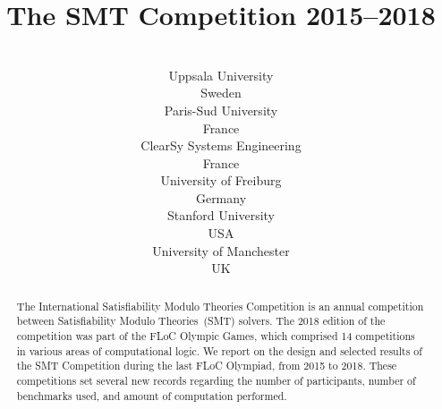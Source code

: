 \documentclass[twoside,11pt]{article}
\begin{document}
\title{The SMT Competition 2015--2018}

\author{%
   \\
  \addr Uppsala University \\
  Sweden
  \AND
   \\
  \addr Paris-Sud University \\
  France
  \AND
   \\
  \addr ClearSy Systems Engineering \\
  France
  \AND
   \\
  \addr University of Freiburg \\
  Germany
  \AND
   \\
  \addr Stanford University\\
  USA
  \AND
   \\
  \addr University of Manchester \\
  UK}

\maketitle


\begin{abstract}
  The International Satisfiability Modulo Theories Competition is an
  annual competition between Satisfiability Modulo Theories~(SMT)
  solvers.  The 2018 edition of the competition was part of the FLoC
  Olympic Games, which comprised 14 competitions in various areas of
  computational logic.  We report on the design and selected results
  of the SMT Competition during the last FLoC Olympiad, from 2015 to
  2018.  These competitions set several new records regarding the
  number of participants, number of benchmarks used, and amount of
  computation performed.
\end{abstract}
\end{document}
